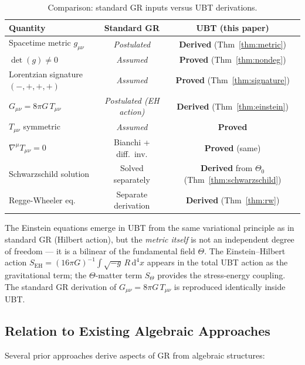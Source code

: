 \documentclass[12pt,a4paper]{article}
\theoremstyle{definition}
\theoremstyle{remark}
\begin{document}
\begin{table}[ht]
\centering
\caption{Comparison: standard GR inputs versus UBT derivations.}
\label{tab:comparison}
\begin{tabular}{lcc}
\toprule
\textbf{Quantity} & \textbf{Standard GR} & \textbf{UBT (this paper)} \\
\midrule
Spacetime metric $g_{\mu\nu}$ & \emph{Postulated} & \textbf{Derived} (Thm~\ref{thm:metric}) \\
$\det(g) \neq 0$ & \emph{Assumed} & \textbf{Proved} (Thm~\ref{thm:nondeg}) \\
Lorentzian signature $(-,+,+,+)$ & \emph{Assumed} & \textbf{Proved} (Thm~\ref{thm:signature}) \\
$G_{\mu\nu} = 8\pi G\,T_{\mu\nu}$ & \emph{Postulated (EH action)} & \textbf{Derived} (Thm~\ref{thm:einstein}) \\
$T_{\mu\nu}$ symmetric & \emph{Assumed} & \textbf{Proved} \\
$\nabla^\mu T_{\mu\nu} = 0$ & Bianchi + diff.\ inv. & \textbf{Proved} (same) \\
Schwarzschild solution & Solved separately & \textbf{Derived} from $\Theta_0$ (Thm~\ref{thm:schwarzschild}) \\
Regge-Wheeler eq. & Separate derivation & \textbf{Derived} (Thm~\ref{thm:rw}) \\
\bottomrule
\end{tabular}
\end{table}

The Einstein equations emerge in UBT from the same variational principle as
in standard GR (Hilbert action), but the \emph{metric itself} is not an
independent degree of freedom — it is a bilinear of the fundamental field
$\Theta$.
The Einstein--Hilbert action $S_{\mathrm{EH}} = (16\pi G)^{-1}\int\!\sqrt{-g}\,R\,\mathrm{d}^4x$
appears in the total UBT action as the gravitational term; the $\Theta$-matter
term $S_\Theta$ provides the stress-energy coupling.
The standard GR derivation of $G_{\mu\nu} = 8\pi G\,T_{\mu\nu}$ is
reproduced identically inside UBT.

\subsection{Relation to Existing Algebraic Approaches}

Several prior approaches derive aspects of GR from algebraic structures:
\end{document}
